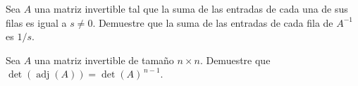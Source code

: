\begin{prob}
Sea $A$ una matriz invertible tal que la suma de las entradas de cada una de sus filas es igual a $s\neq 0$. Demuestre que la suma de las entradas de cada fila de $A^{-1}$ es $1/s$.
\end{prob}

\begin{prob}
Sea $A$ una matriz invertible de tamaño $n\times n$. Demuestre que $\det(\operatorname{adj}(A))=\det(A)^{\,n-1}$.
\end{prob}
